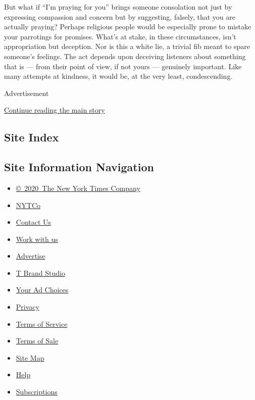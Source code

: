 But what if ``I'm praying for you'' brings someone consolation not just
by expressing compassion and concern but by suggesting, falsely, that
you are actually praying? Perhaps religious people would be especially
prone to mistake your parrotings for promises. What's at stake, in these
circumstances, isn't appropriation but deception. Nor is this a white
lie, a trivial fib meant to spare someone's feelings. The act depends
upon deceiving listeners about something that is --- from their point of
view, if not yours --- genuinely important. Like many attempts at
kindness, it would be, at the very least, condescending.

Advertisement

\protect\hyperlink{after-bottom}{Continue reading the main story}

\hypertarget{site-index}{%
\subsection{Site Index}\label{site-index}}

\hypertarget{site-information-navigation}{%
\subsection{Site Information
Navigation}\label{site-information-navigation}}

\begin{itemize}
\tightlist
\item
  \href{https://help.nytimes.com/hc/en-us/articles/115014792127-Copyright-notice}{©~2020~The
  New York Times Company}
\end{itemize}

\begin{itemize}
\tightlist
\item
  \href{https://www.nytco.com/}{NYTCo}
\item
  \href{https://help.nytimes.com/hc/en-us/articles/115015385887-Contact-Us}{Contact
  Us}
\item
  \href{https://www.nytco.com/careers/}{Work with us}
\item
  \href{https://nytmediakit.com/}{Advertise}
\item
  \href{http://www.tbrandstudio.com/}{T Brand Studio}
\item
  \href{https://www.nytimes.com/privacy/cookie-policy\#how-do-i-manage-trackers}{Your
  Ad Choices}
\item
  \href{https://www.nytimes.com/privacy}{Privacy}
\item
  \href{https://help.nytimes.com/hc/en-us/articles/115014893428-Terms-of-service}{Terms
  of Service}
\item
  \href{https://help.nytimes.com/hc/en-us/articles/115014893968-Terms-of-sale}{Terms
  of Sale}
\item
  \href{https://spiderbites.nytimes.com}{Site Map}
\item
  \href{https://help.nytimes.com/hc/en-us}{Help}
\item
  \href{https://www.nytimes.com/subscription?campaignId=37WXW}{Subscriptions}
\end{itemize}

